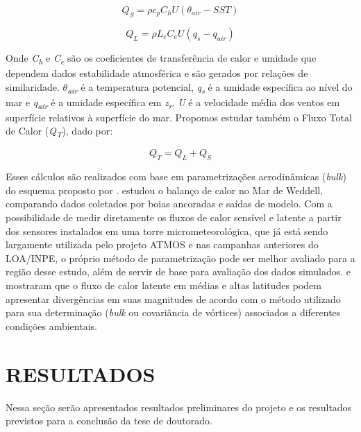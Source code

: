 \documentclass{article}
\begin{document}
\begin{equation}
Q_{S} = \rho c_{p}C_{h}U(\theta_{air}-SST)
\end{equation}

\begin{equation}
Q_{L} = \rho L_{e}C_{e}U(q_{s}-q_{air})
\end{equation}
\bigskip

Onde \textit{C\textsubscript{h}} e \textit{C\textsubscript{e}} são os coeficientes de transferência de calor e umidade que dependem dados
estabilidade atmosférica e são gerados por relações de similaridade. \textit{$\theta$\textsubscript{air}} é a temperatura potencial,
\textit{q\textsubscript{s}} é a umidade específica ao nível do mar e \textit{q\textsubscript{air}} é a umidade específica em \textit{z\textsubscript{r}}.
\textit{U} é a velocidade média dos ventos em superfície relativos à superfície do mar. Propomos estudar também o Fluxo Total de Calor (\textit{Q\textsubscript{T}}), dado por:

\begin{equation}
	Q_{T} = Q_{L} + Q_{S}
\end{equation}
\bigskip

Esses cálculos são realizados com base em parametrizações aerodinâmicas (\textit{bulk}) do
esquema proposto por \textcite{Fairall2003}.  \textcite{Vihma2002} estudou o balanço de calor no Mar de 
Weddell, comparando  dados  coletados por boias ancoradas e saídas de modelo. Com a possibilidade de medir 
diretamente os fluxos de calor sensível e latente a partir dos sensores instalados em uma torre  
micrometeorológica, que já está sendo largamente utilizada pelo projeto ATMOS e nas  campanhas anteriores do LOA/INPE, 
o próprio método de parametrização pode ser melhor avaliado para a região desse estudo, além de servir de  
base para avaliação  dos  dados  simulados. \textcite{Santini2018} e \textcite{Butterworth2016} mostraram  
que o fluxo de calor latente em médias e altas  latitudes podem apresentar divergências em suas  magnitudes 
de acordo  com o método utilizado para sua determinação (\textit{bulk} ou  covariância de vórtices) associados a diferentes 
condições ambientais.

\section{RESULTADOS}
\bigskip

Nessa seção serão apresentados resultados preliminares do projeto e os resultados previstos para a conclusão da tese de doutorado.
\end{document}
